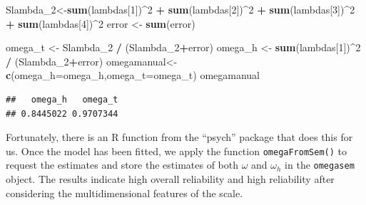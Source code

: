 \documentclass[]{book}
\newenvironment{Shaded}{\begin{snugshade}}{\end{snugshade}}
\newcommand{\DataTypeTok}[1]{\textcolor[rgb]{0.13,0.29,0.53}{#1}}
\newcommand{\DecValTok}[1]{\textcolor[rgb]{0.00,0.00,0.81}{#1}}
\newcommand{\KeywordTok}[1]{\textcolor[rgb]{0.13,0.29,0.53}{\textbf{#1}}}
\newcommand{\NormalTok}[1]{#1}
\newcommand{\OperatorTok}[1]{\textcolor[rgb]{0.81,0.36,0.00}{\textbf{#1}}}
\newcommand{\StringTok}[1]{\textcolor[rgb]{0.31,0.60,0.02}{#1}}
\begin{document}
\begin{Shaded}
\begin{Highlighting}[]
\NormalTok{Slambda_}\DecValTok{2}\NormalTok{<-}\KeywordTok{sum}\NormalTok{(lambdas[}\DecValTok{1}\NormalTok{])}\OperatorTok{^}\DecValTok{2} \OperatorTok{+}\StringTok{ }\KeywordTok{sum}\NormalTok{(lambdas[}\DecValTok{2}\NormalTok{])}\OperatorTok{^}\DecValTok{2} \OperatorTok{+}\StringTok{ }
\StringTok{           }\KeywordTok{sum}\NormalTok{(lambdas[}\DecValTok{3}\NormalTok{])}\OperatorTok{^}\DecValTok{2} \OperatorTok{+}\StringTok{ }\KeywordTok{sum}\NormalTok{(lambdas[}\DecValTok{4}\NormalTok{])}\OperatorTok{^}\DecValTok{2}
\NormalTok{error <-}\StringTok{ }\KeywordTok{sum}\NormalTok{(error)}

\NormalTok{omega_t <-}\StringTok{ }\NormalTok{Slambda_}\DecValTok{2} \OperatorTok{/}\StringTok{ }\NormalTok{(Slambda_}\DecValTok{2}\OperatorTok{+}\NormalTok{error)}
\NormalTok{omega_h <-}\StringTok{ }\KeywordTok{sum}\NormalTok{(lambdas[}\DecValTok{1}\NormalTok{])}\OperatorTok{^}\DecValTok{2} \OperatorTok{/}\StringTok{ }\NormalTok{(Slambda_}\DecValTok{2}\OperatorTok{+}\NormalTok{error)}
\NormalTok{omegamanual<-}\KeywordTok{c}\NormalTok{(}\DataTypeTok{omega_h=}\NormalTok{omega_h,}\DataTypeTok{omega_t=}\NormalTok{omega_t)}
\NormalTok{omegamanual}
\end{Highlighting}
\end{Shaded}

\begin{verbatim}
##   omega_h   omega_t 
## 0.8445022 0.9707344
\end{verbatim}

Fortunately, there is an R function from the ``psych'' package that does this for us. Once the model has been fitted, we apply the function \texttt{omegaFromSem()} to request the estimates and store the estimates of both \(\omega\) and \(\omega_h\) in the \texttt{omegasem} object. The results indicate high overall reliability and high reliability after considering the multidimensional features of the scale.

\begin{Shaded}
\end{Shaded}
\end{document}
